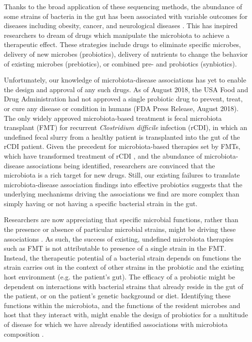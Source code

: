 \documentclass[11pt,twocolumn,notitlepage,openany,twoside]{book}
\begin{document}
\begin{refsection}
Thanks to the broad application of these sequencing methods, the abundance of some strains of bacteria in the gut has been associated with variable outcomes for diseases including obesity, cancer, and neurological diseases \cite{Young2017-xs}. This has inspired researchers to dream of drugs which manipulate the microbiota to achieve a therapeutic effect. These strategies include drugs to eliminate specific microbes, delivery of new microbes (probiotics), delivery of nutrients to change the behavior of existing microbes (prebiotics), or combined pre- and probiotics (synbiotics)\cite{OToole2017-th}.

Unfortunately, our knowledge of microbiota-disease associations has yet to enable the design and approval of any such drugs. As of August 2018, the USA Food and Drug Administration had not approved a single probiotic drug to prevent, treat, or cure any disease or condition in humans (FDA Press Release, August 2018). The only widely approved microbiota-based treatment is fecal microbiota transplant (FMT) for recurrent \textit{Clostridium difficile} infection (rCDI), in which an undefined fecal slurry from a healthy patient is transplanted into the gut of the rCDI patient. Given the precedent for microbiota-based therapies set by FMTs, which have transformed treatment of rCDI \cite{Kelly2016-ph}, and the abundance of microbiota-disease associations being identified, researchers are convinced that the microbiota is a rich target for new drugs. Still, our existing failures to translate microbiota-disease association findings into effective probiotics suggests that the underlying mechanisms driving the associations we find are more complex than simply having or not having a specific bacterial strain in the gut.

Researchers are now appreciating that specific microbial functions, rather than the presence or absence of particular microbial strains, might be driving these associations \cite{Heintz-Buschart2018-xc}. As such, the success of existing, undefined microbiota therapies such as FMT is not attributable to presence of a single strain in the FMT. Instead, the therapeutic potential of a bacterial strain depends on functions the strain carries out in the context of other strains in the probiotic and the existing host environment (e.g. the patient’s gut). The efficacy of a probiotic might be dependent on interactions with bacterial strains that already reside in the gut of the patient, or on the patient’s genetic background or diet. Identifying these functions within the microbiota, and the functions of the resident microbes and host that they interact with, might enable the design of probiotics for a multitude of disease for which we have already identified associations with microbiota composition \cite{OToole2017-th}.


\end{refsection}
\end{document}
